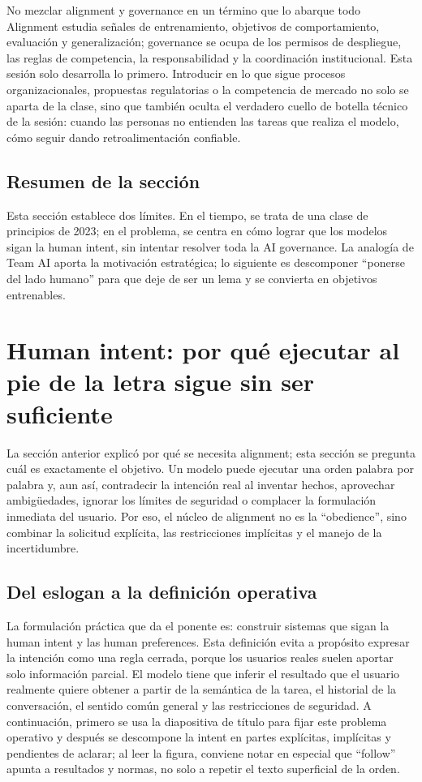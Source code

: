 \documentclass[a4paper]{article}
\begin{document}
\begin{warningbox}{No mezclar alignment y governance en un término que lo abarque todo}
Alignment estudia señales de entrenamiento, objetivos de comportamiento, evaluación y generalización; governance se ocupa de los permisos de despliegue, las reglas de competencia, la responsabilidad y la coordinación institucional. Esta sesión solo desarrolla lo primero. Introducir en lo que sigue procesos organizacionales, propuestas regulatorias o la competencia de mercado no solo se aparta de la clase, sino que también oculta el verdadero cuello de botella técnico de la sesión: cuando las personas no entienden las tareas que realiza el modelo, cómo seguir dando retroalimentación confiable.
\end{warningbox}

\subsection{Resumen de la sección}

Esta sección establece dos límites. En el tiempo, se trata de una clase de principios de 2023; en el problema, se centra en cómo lograr que los modelos sigan la human intent, sin intentar resolver toda la AI governance. La analogía de Team AI aporta la motivación estratégica; lo siguiente es descomponer ``ponerse del lado humano'' para que deje de ser un lema y se convierta en objetivos entrenables.
\section{Human intent: por qué ejecutar al pie de la letra sigue sin ser suficiente}

La sección anterior explicó por qué se necesita alignment; esta sección se pregunta cuál es exactamente el objetivo. Un modelo puede ejecutar una orden palabra por palabra y, aun así, contradecir la intención real al inventar hechos, aprovechar ambigüedades, ignorar los límites de seguridad o complacer la formulación inmediata del usuario. Por eso, el núcleo de alignment no es la ``obedience'', sino combinar la solicitud explícita, las restricciones implícitas y el manejo de la incertidumbre.

\subsection{Del eslogan a la definición operativa}

La formulación práctica que da el ponente es: construir sistemas que sigan la human intent y las human preferences. Esta definición evita a propósito expresar la intención como una regla cerrada, porque los usuarios reales suelen aportar solo información parcial. El modelo tiene que inferir el resultado que el usuario realmente quiere obtener a partir de la semántica de la tarea, el historial de la conversación, el sentido común general y las restricciones de seguridad. A continuación, primero se usa la diapositiva de título para fijar este problema operativo y después se descompone la intent en partes explícitas, implícitas y pendientes de aclarar; al leer la figura, conviene notar en especial que ``follow'' apunta a resultados y normas, no solo a repetir el texto superficial de la orden.
\end{document}
